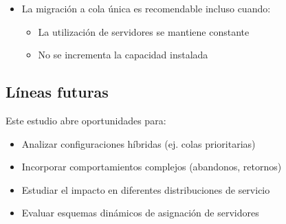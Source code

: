 \documentclass{article}
\begin{document}
\begin{itemize}
    \item La migración a cola única es recomendable incluso cuando:
        \begin{itemize}
            \item La utilización de servidores se mantiene constante
            \item No se incrementa la capacidad instalada
        \end{itemize}
\end{itemize}

\subsection{Líneas futuras}
Este estudio abre oportunidades para:
\begin{itemize}
    \item Analizar configuraciones híbridas (ej. colas prioritarias)
    \item Incorporar comportamientos complejos (abandonos, retornos)
    \item Estudiar el impacto en diferentes distribuciones de servicio
    \item Evaluar esquemas dinámicos de asignación de servidores
\end{itemize}

\newpage

\printbibliography
\end{document}
